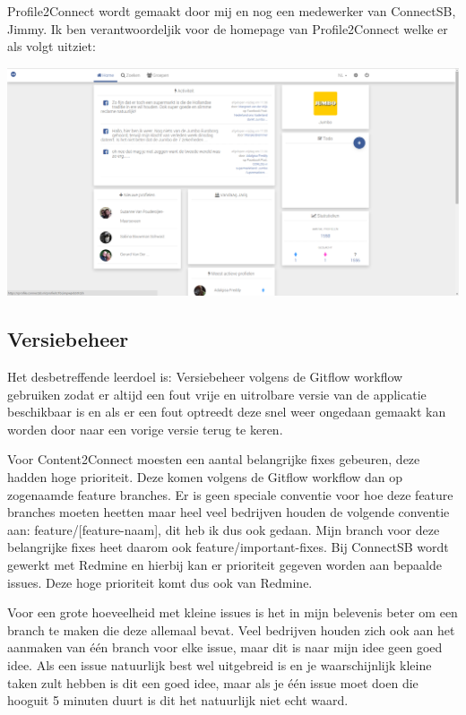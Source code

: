 \newline

Profile2Connect wordt gemaakt door mij en nog een medewerker van ConnectSB, Jimmy. Ik ben verantwoordeljik voor de homepage van Profile2Connect welke er als volgt uitziet:

\begin{center}
\includegraphics[scale=0.2]{profile2connect}
\end{center}

\subsection{Versiebeheer}
Het desbetreffende leerdoel is: Versiebeheer volgens de Gitflow workflow gebruiken zodat er altijd een fout vrije en uitrolbare versie van de applicatie beschikbaar is en als er een fout optreedt deze snel weer ongedaan gemaakt kan worden door naar een vorige versie terug te keren.

\newline

Voor Content2Connect moesten een aantal belangrijke fixes gebeuren, deze hadden hoge prioriteit. Deze komen volgens de Gitflow workflow dan op zogenaamde feature branches. Er is geen speciale conventie voor hoe deze feature branches moeten heetten maar heel veel bedrijven houden de volgende conventie aan: feature/[feature-naam], dit heb ik dus ook gedaan. Mijn branch voor deze belangrijke fixes heet daarom ook feature/important-fixes. Bij ConnectSB wordt gewerkt met Redmine en hierbij kan er prioriteit gegeven worden aan bepaalde issues. Deze hoge prioriteit komt dus ook van Redmine.

Voor een grote hoeveelheid met kleine issues is het in mijn belevenis beter om een branch te maken die deze allemaal bevat. Veel bedrijven houden zich ook aan het aanmaken van één branch voor elke issue, maar dit is naar mijn idee geen goed idee. Als een issue natuurlijk best wel uitgebreid is en je waarschijnlijk kleine taken zult hebben is dit een goed idee, maar als je één issue moet doen die hooguit 5 minuten duurt is dit het natuurlijk niet echt waard.

